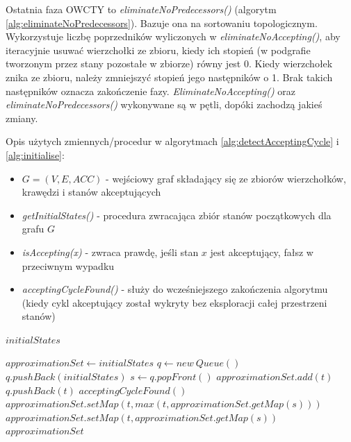 Ostatnia faza OWCTY to \textit{eliminateNoPredecessors()} (algorytm \ref{alg:eliminateNoPredecessors}).
Bazuje ona na sortowaniu topologicznym.
Wykorzystuje liczbę poprzedników wyliczonych w \textit{eliminateNoAccepting()}, aby iteracyjnie usuwać wierzchołki ze zbioru, kiedy ich stopień (w podgrafie tworzonym przez stany pozostałe w zbiorze) równy jest 0.
Kiedy wierzchołek znika ze zbioru, należy zmniejszyć stopień jego następników o 1.
Brak takich następników oznacza zakończenie fazy.
\textit{EliminateNoAccepting()} oraz \textit{eliminateNoPredecessors()} wykonywane są w pętli, dopóki zachodzą jakieś zmiany.

\noindent
Opis użytych zmiennych/procedur w algorytmach \ref{alg:detectAcceptingCycle} i \ref{alg:initialise}:
\begin{itemize}
\item $ G = (V,E,ACC) $ - wejściowy graf składający się ze zbiorów wierzchołków, krawędzi i stanów akceptujących
\item \textit{getInitialStates()} - procedura zwracająca zbiór stanów początkowych dla grafu $G$
\item \textit{isAccepting(x)} - zwraca prawdę, jeśli stan $x$ jest akceptujący, fałsz w przeciwnym wypadku
\item \textit{acceptingCycleFound()} - służy do wcześniejszego zakończenia algorytmu (kiedy cykl akceptujący został wykryty bez eksploracji całej przestrzeni stanów)
\end{itemize}

\begin{algorithm}
\caption{$ initialise(initialStates) $}
\label{alg:initialise}
\begin{algorithmic}[1]
\REQUIRE $ initialStates $

\STATE $ approximationSet \leftarrow initialStates $
\STATE $ q \leftarrow new\ Queue() $
\STATE $ q.pushBack(initialStates) $
  \STATE $ s \leftarrow q.popFront() $
      \STATE $ approximationSet.add(t) $
      \STATE $ q.pushBack(t) $
    \ENDIF
        \STATE $ acceptingCycleFound() $
        \RETURN
      \ENDIF
      \STATE $ approximationSet.setMap(t, max(t, approximationSet.getMap(s))) $
    \ELSE
      \STATE $ approximationSet.setMap(t, approximationSet.getMap(s)) $
    \ENDIF
  \ENDFOR
\ENDWHILE
\RETURN $ approximationSet $
\end{algorithmic}
\end{algorithm}


